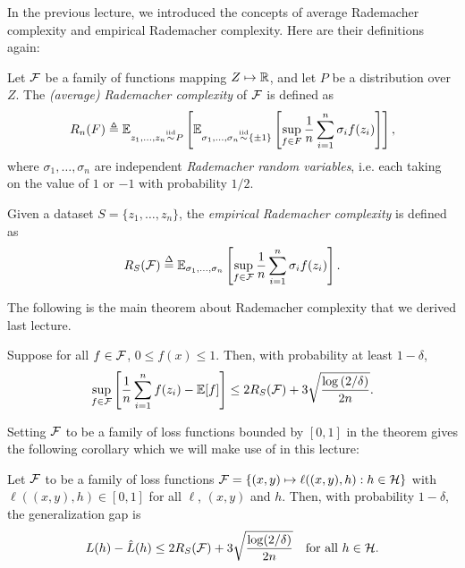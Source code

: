 \setcounter{section}{0}



In the previous lecture, we introduced the concepts of average Rademacher complexity and empirical Rademacher complexity. Here are their definitions again:

\begin{definition}
Let $\mathcal F$ be a family of functions mapping $Z \mapsto \mathbb R$, and let $P$ be a distribution over $Z$. The \textit{(average) Rademacher complexity} of $\mathcal F$ is defined as 
\begin{align}
    R_n(F) \triangleq {\mathbb{E}}_{z_1, \dots, z_n \overset{\textup{iid}}{\sim} P} \left[ 
    {\mathbb{E}}_{\sigma_1, \dots, \sigma_n \overset{\textup{iid}}{\sim}\{ \pm 1 \}} \left[ \sup_{f\in F} \frac{1}{n} \sum^n_{i=1} \sigma_i f(z_i) \right] \right], 
\end{align}
where $\sigma_1, \dots, \sigma_n$ are independent \textit{Rademacher random variables}, i.e. each taking on the value of $1$ or $-1$ with probability $1/2$.
\end{definition}

\begin{definition}
Given a dataset $S = \{z_1, \dots, z_n\}$, the \textit{empirical Rademacher complexity} is defined as
\begin{equation}
R_S(\mathcal F) \overset{\Delta}{=} \mathbb{E}_{\sigma_1,\dots, \sigma_n} \left[ \sup_{f\in \mathcal F} \frac{1}{n} \sum^n_{i=1} \sigma_i f(z_i) \right].
\end{equation}
\end{definition}
The following is the main theorem about Rademacher complexity that we derived last lecture.
\begin{theorem}
    Suppose for all $f \in \mathcal F$, $0 \leq f(x) \leq 1$. Then, with probability at least $1-\delta$,
    \begin{align}
        \sup_{f\in \mathcal F} \left[ \frac{1}{n} \sum^n_{i=1} f(z_i) - \mathbb{E}[f] \right] \leq 2 R_S(\mathcal F) + 3\sqrt{\frac{\log{(2/\delta)}}{2n}}.
    \end{align}
\end{theorem}
Setting $\mathcal F$ to be a family of loss functions bounded by $[0,1]$ in the theorem gives the following corollary which we will make use of in this lecture:

\begin{corollary}\label{lec6:cor:ggap-rsbound}
Let $\mathcal F$ to be a family of loss functions $\mathcal F = \left\{ (x,y) \mapsto \ell((x,y),h): h \in \mathcal H \right\}$ with $\ell((x,y), h) \in [0,1]$ for all $\ell$, $(x,y)$ and $h$. Then, with probability $1-\delta,$ the generalization gap is
    \begin{equation}\label{lec6:eqn:ggap-rsbound}
        L(h) - \hat L(h) \leq 2R_S(\mathcal F) + 3\sqrt{\frac{\log(2/\delta)}{2n}} \quad \text{for all } h\in \mathcal H.
    \end{equation}
\end{corollary}


